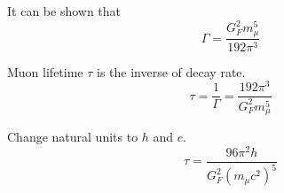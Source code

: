 \bigskip
It can be shown that
\begin{equation*}
\Gamma=\frac{G_F^2 m_\mu^5}{192\pi^3}
\end{equation*}

Muon lifetime $\tau$ is the inverse of decay rate.
\begin{equation*}
\tau=\frac{1}{\Gamma}=\frac{192\pi^3}{G_F^2 m_\mu^5}
\end{equation*}

Change natural units to $h$ and $c$.
\begin{equation*}
\tau=\frac{96\pi^2h}{G_F^2\left(m_\mu c^2\right)^5}
\end{equation*}


